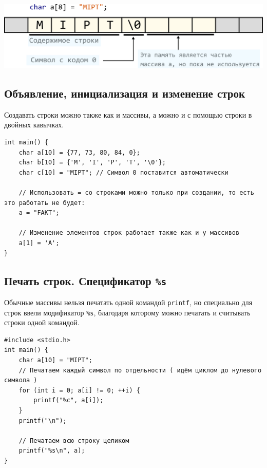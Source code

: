 \documentclass{article}
\begin{document}
\begin{center}
\includegraphics[scale=0.75]{../images/string_in_memory.png}
\end{center}

\subsection*{Объявление, инициализация и изменение строк}
Создавать строки можно также как и массивы, а можно и с помощью строки в двойных кавычках.
\begin{lstlisting}
int main() {
    char a[10] = {77, 73, 80, 84, 0};
    char b[10] = {'M', 'I', 'P', 'T', '\0'};
    char c[10] = "MIPT"; // Символ 0 поставится автоматически
	
    // Использовать = со строками можно только при создании, то есть это работать не будет:
    a = "FAKT";
    
    // Изменение элементов строк работает также как и у массивов
    a[1] = 'A';
}
\end{lstlisting}

\subsection*{Печать строк. Спецификатор \texttt{\%s}}
Обычные массивы нельзя печатать одной командой \texttt{printf}, но специально для строк ввели модификатор \texttt{\%s}, благодаря которому можно печатать и считывать строки одной командой.
\begin{lstlisting}
#include <stdio.h>
int main() {
    char a[10] = "MIPT";
    // Печатаем каждый символ по отдельности ( идём циклом до нулевого символа )
    for (int i = 0; a[i] != 0; ++i) {
        printf("%c", a[i]);
    }
    printf("\n");
	
    // Печатаем всю строку целиком
    printf("%s\n", a);
}
\end{lstlisting}
\end{document}
